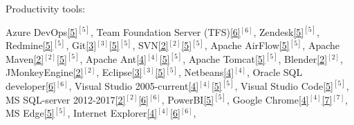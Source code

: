 \begin{cventries}
  \cventry
    {Productivity tools:} %
    {} %
    {} %
    {} %
    {
      \vspace{0.1cm}
      \begin{cvitems} %
        \item[] {        
        \textcolor{rainbowcolor-olive}{Azure DevOps\ref{5}{$^{[5]}$}},         
        \textcolor{rainbowcolor-olive}{Team Foundation Server (TFS)\ref{6}{$^{[6]}$}},
        \textcolor{rainbowcolor-olive}{Zendesk\ref{5}{$^{[5]}$}},
        \textcolor{rainbowcolor-olive}{Redmine\ref{5}{$^{[5]}$}},
        \textcolor{rainbowcolor-olive}{Git\ref{3}{$^{[3]}$}\ref{5}{$^{[5]}$}}, 
        \textcolor{rainbowcolor-olive}{SVN\ref{2}{$^{[2]}$}\ref{5}{$^{[5]}$}},
        \textcolor{rainbowcolor-olive}{Apache AirFlow\ref{5}{$^{[5]}$}},
        \textcolor{rainbowcolor-olive}{Apache Maven\ref{2}{$^{[2]}$}\ref{5}{$^{[5]}$}},
        \textcolor{rainbowcolor-olive}{Apache Ant\ref{4}{$^{[4]}$}\ref{5}{$^{[5]}$}},  
        \textcolor{rainbowcolor-olive}{Apache Tomcat\ref{5}{$^{[5]}$}}, 
        \textcolor{rainbowcolor-olive}{Blender\ref{2}{$^{[2]}$}}, 
        \textcolor{rainbowcolor-olive}{JMonkeyEngine\ref{2}{$^{[2]}$}}, 
        \textcolor{rainbowcolor-olive}{Eclipse\ref{3}{$^{[3]}$}\ref{5}{$^{[5]}$}},  
        \textcolor{rainbowcolor-olive}{Netbeans\ref{4}{$^{[4]}$}}, 
        \textcolor{rainbowcolor-olive}{Oracle SQL developer\ref{6}{$^{[6]}$}},
        \textcolor{rainbowcolor-olive}{Visual Studio 2005-current\ref{4}{$^{[4]}$}\ref{5}{$^{[5]}$}},
        \textcolor{rainbowcolor-olive}{Visual Studio Code\ref{5}{$^{[5]}$}},
        \textcolor{rainbowcolor-olive}{MS SQL-server 2012-2017\ref{2}{$^{[2]}$}\ref{6}{$^{[6]}$}},
		\textcolor{rainbowcolor-olive}{PowerBI\ref{5}{$^{[5]}$}}, 
        \textcolor{rainbowcolor-olive}{Google Chrome\ref{4}{$^{[4]}$}\ref{7}{$^{[7]}$}},
        \textcolor{rainbowcolor-olive}{MS Edge\ref{5}{$^{[5]}$}},
        \textcolor{rainbowcolor-olive}{Internet Explorer\ref{4}{$^{[4]}$}\ref{6}{$^{[6]}$}},
}
\end{cvitems}}
\end{cventries}
